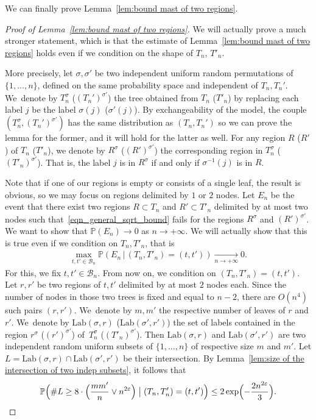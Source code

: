 \documentclass[JEP,XML,SOM,Unicode,NoFloatCountersInSection,published]{cedram}
\newcommand{\Pp}[1]{\mathbb{P} \left(#1\right)}
\newcommand{\BPpsq}[2]{\mathbb{P} \Bigl(#1\bigm|#2\Bigr)}
\let\eps\varepsilon
\theoremstyle{plain}
\theoremstyle{definition}
\begin{document}
We can finally prove Lemma~\ref{lem:bound mast of two regions}.
\begin{proof}[Proof of Lemma~\ref{lem:bound mast of two regions}]
We will actually prove a much stronger statement, which is that the estimate of Lemma~\ref{lem:bound mast of two regions} holds even if we condition on the shape of $T_n$, $T'_n$.

More precisely, let $\sigma,\sigma'$ be two independent uniform random permutations of $\{1,\dots,n\}$, defined on the same probability space and independent of $T_n, T_n'$. We~denote by $T_n^\sigma$ (\resp $(T_n')^{\sigma'}$) the tree obtained from $T_n$ (\resp $T'_n$) by replacing each label $j$ be the label $\sigma(j)$ (\resp $\sigma'(j)$). By exchangeability of the model, the couple $(T_n^\sigma,(T_n')^{\sigma'})$ has the same distribution as $(T_n,T_n')$ so we can prove the lemma for the former, and it will hold for the latter as well. For any region $R$ (\resp $R'$) of $T_n$ (\resp $T'_n$), we denote by $R^{\sigma}$ (\resp $(R')^{\sigma'}$) the corresponding region in $T_n^{\sigma}$ (\resp $(T'_n)^{\sigma'}$). That is, the label $j$ is in $R^{\sigma}$ if and only if $\sigma^{-1}(j)$ is in $R$.

Note that if one of our regions is empty or consists of a single leaf, the result is obvious, so we may focus on regions delimited by $1$ or $2$ nodes.
Let $E_n$ be the event that there exist two regions $R \subset T_n$ and $R' \subset T'_n$ delimited by at most two nodes such that~\eqref{eqn_general_sqrt_bound} fails for the regions $R^{\sigma}$ and $(R')^{\sigma'}$.
We want to show that $\Pp{E_n} \to 0$ as $n \to +\infty$.
We will actually show that this is true even if we condition on $T_n, T'_n$, that is
\begin{align}\label{eqn:sqrt_bound_conditioned_on_shape}
\max_{t,t' \in \mathcal{B}_n} \Pp{E_n \, | \, (T_n, T'_n)=(t,t')} \xrightarrow[n \to +\infty]{} 0.
\end{align}
For this, we fix $t,t' \in \mathcal{B}_n$.
From now on, we condition on $(T_n,T'_n)=(t,t')$.
Let $r,r'$ be two regions of $t,t'$ delimited by at most $2$ nodes each.
Since the number of nodes in those two trees is fixed and equal to $n-2$, there are $O(n^4)$ such pairs $(r,r')$.
We~denote by $m,m'$ the respective number of leaves of $r$ and $r'$.
We~denote by $\mathrm{Lab}(\sigma,r)$ (\resp $\mathrm{Lab}(\sigma',r')$) the set of labels contained in the region $r^{\sigma}$ (\resp $(r')^{\sigma'}$) of~$T_n^{\sigma}$ (\resp $(T'_n)^{\sigma'}$).
Then $\mathrm{Lab}(\sigma,r)$ and $\mathrm{Lab}(\sigma',r')$ are two independent random uniform subsets of $\{1,\dots,n\}$ of respective size $m$ and $m'$. Let $L=\mathrm{Lab}(\sigma,r)\cap \mathrm{Lab}(\sigma',r')$ be their intersection. By Lemma~\ref{lem:size of the intersection of two indep subsets}, it follows that
\begin{equation}\label{eqn:conditioned_sqrt_bound_step1}
\BPpsq{\#L \geq 8 \cdot \Bigl(\frac{m m'}{n} \vee n^{2\eps} \Bigr)}{ (T_n,T'_n)=(t,t')} \leq 2 \exp\Bigl(-\frac{2n^{2\eps}}{3}\Bigr).
\end{equation}


\end{proof}
\end{document}
